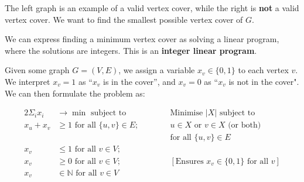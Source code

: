 \documentclass[11pt,a4paper,titlepage,dvipsnames,cmyk]{scrartcl}
\begin{document}
\begin{figure}[htpb]
\begin{center}
\end{center}
\end{figure}

The left graph is an example of a valid vertex cover, while the right is
\textbf{not} a valid vertex cover. We want to find the smallest possible
vertex cover of $G$.

We can express finding a minimum vertex cover as solving a linear program,
where the solutions are integers. This is an \textbf{integer linear
program}.

Given some graph $G = (V,E)$, we assign a variable $x_v \in \{0,1\}$ to
each vertex $v$. We interpret $x_v = 1$ as ``$x_v$  is in the cover'', and
$x_v =0$ as ``$x_v$ is not in the cover". We can then formulate the
problem as:

\begin{alignat*}{2}
    \Sigma_i x_i &\rightarrow \min \text{ subject to } &\text{Minimise }
    |X| \text{ subject to} \\
    x_u + x_v &\ge 1 \text{ for all } \{u,v\} \in E; \quad \quad \quad &u\in X \text{ or }
    v\in X \text{ (or both)} \\
              &\text{} &\text{for all } \{u,v\} \in E \\
    x_v &\le 1 \text{ for all } v \in V; &\text{} \\
    x_v &\ge 0 \text{ for all } v \in V; &[\text{Ensures } x_v \in \{0,1\}
    \text{ for all } v] \\
    x_v &\in \mathbb{N} \text{ for all } v \in V 
\end{alignat*}
\end{document}
